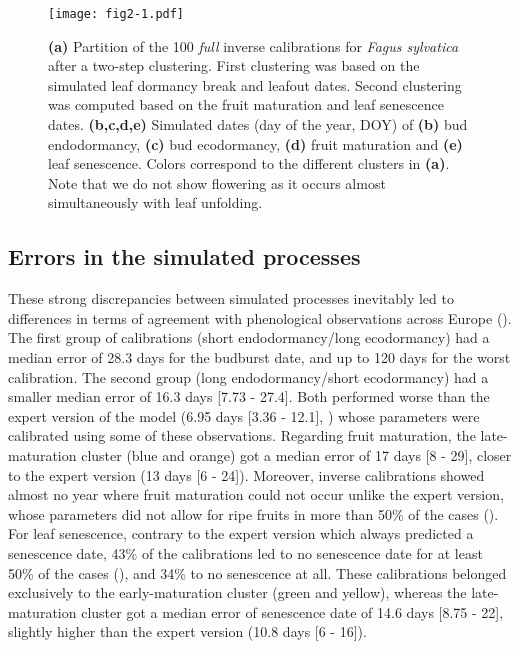 \documentclass[preprint,12pt,authoryear]{elsarticle}
\begin{document}
\begin{figure}[hb]
\begin{subcaptiongroup}
\label{fig:2A} 
\label{fig:2B}
\label{fig:2C}
\label{fig:2D}
\label{fig:2E}
\end{subcaptiongroup}
\centerline{\texttt{[image: fig2-1.pdf]}}
\caption{\textbf{(a)} Partition of the 100 \emph{full} inverse calibrations for \emph{Fagus sylvatica} after a two-step clustering. First clustering was based on the simulated leaf dormancy break and leafout dates. Second clustering was computed based on the fruit maturation and leaf senescence dates. \textbf{(b,c,d,e)} Simulated dates (day of the year, DOY) of \textbf{(b)} bud endodormancy, \textbf{(c)} bud ecodormancy, \textbf{(d)} fruit maturation and \textbf{(e)} leaf senescence. Colors correspond to the different clusters in \textbf{(a)}. Note that we do not show flowering as it occurs almost simultaneously with leaf unfolding.}
\label{fig:2}
\end{figure}

\subsection{Errors in the simulated processes}

These strong discrepancies between simulated processes inevitably led to differences in terms of agreement with phenological observations across Europe (). The first group of calibrations (short endodormancy/long ecodormancy) had a median error of 28.3 days for the budburst date, and up to 120 days for the worst calibration. The second group (long endodormancy/short ecodormancy) had a smaller median error of 16.3 days [7.73 - 27.4]. Both performed worse than the expert version of the model (6.95 days [3.36 - 12.1], ) whose parameters were calibrated using some of these observations. Regarding fruit maturation, the late-maturation cluster (blue and orange) got a median error of 17 days [8 - 29], closer to the expert version (13 days [6 - 24]). Moreover, inverse calibrations showed almost no year where fruit maturation could not occur unlike the expert version, whose parameters did not allow for ripe fruits in more than 50\% of the cases (). For leaf senescence, contrary to the expert version which always predicted a senescence date, 43\% of the calibrations led to no senescence date for at least 50\% of the cases (), and 34\% to no senescence at all. These calibrations belonged exclusively to the early-maturation cluster (green and yellow), whereas the late-maturation cluster got a median error of senescence date of 14.6 days [8.75 - 22], slightly higher than the expert version (10.8 days [6 - 16]).
\end{document}

